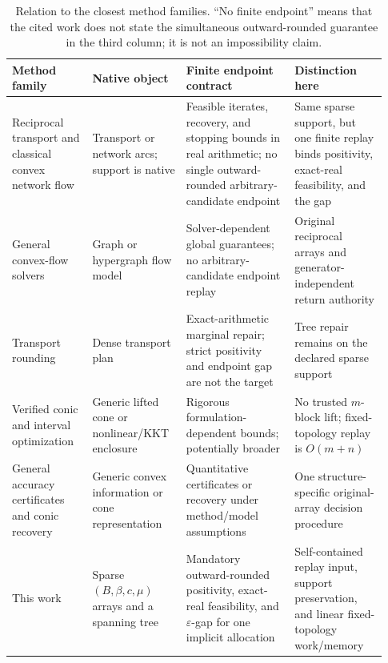\begin{table}[t]
\centering
\caption{Relation to the closest method families.  ``No finite endpoint'' means
that the cited work does not state the simultaneous outward-rounded guarantee
in the third column; it is not an impossibility claim.}
\label{tab:novelty-map}
\scriptsize
\setlength{\tabcolsep}{3pt}
\renewcommand{\arraystretch}{1.12}
\begin{tabular}{@{}
>{\raggedright\arraybackslash}p{0.20\linewidth}
>{\raggedright\arraybackslash}p{0.23\linewidth}
>{\raggedright\arraybackslash}p{0.27\linewidth}
>{\raggedright\arraybackslash}p{0.23\linewidth}@{}}
\toprule
Method family & Native object & Finite endpoint contract & Distinction here \\
\midrule
Reciprocal transport and classical convex network flow
\citep{dessein2018rot,weintraub1974primal,klincewicz1983,
klincewicz1989,bertsekas1997epsilon,marklund2008early}
& Transport or network arcs; support is native
& Feasible iterates, recovery, and stopping bounds in real arithmetic; no
single outward-rounded arbitrary-candidate endpoint
& Same sparse support, but one finite replay binds positivity, exact-real
feasibility, and the gap \\

General convex-flow solvers
\citep{chen2025maxflow,diamandis2024convexflows}
& Graph or hypergraph flow model
& Solver-dependent global guarantees; no arbitrary-candidate endpoint replay
& Original reciprocal arrays and generator-independent return authority \\

Transport rounding \citep{altschuler2017nearlinear}
& Dense transport plan
& Exact-arithmetic marginal repair; strict positivity and endpoint gap are not
the target
& Tree repair remains on the declared sparse support \\

Verified conic and interval optimization
\citep{jansson2004convex,jansson2007conic,jansson2007rigorous,
jansson2009verified,lange2020verification,vsdp2020,rump2010verification}
& Generic lifted cone or nonlinear/KKT enclosure
& Rigorous formulation-dependent bounds; potentially broader
& No trusted $m$-block lift; fixed-topology replay is $O(m+n)$ \\

General accuracy certificates and conic recovery
\citep{nemirovski2010accuracy,burns2026accuracy,
parshakova2025multiple,papp2025fullnewton,lee2025dual}
& Generic convex information or cone representation
& Quantitative certificates or recovery under method/model assumptions
& One structure-specific original-array decision procedure \\

This work
& Sparse $(B,\beta,c,\mu)$ arrays and a spanning tree
& Mandatory outward-rounded positivity, exact-real feasibility, and
$\varepsilon$-gap for one implicit allocation
& Self-contained replay input, support preservation, and linear fixed-topology
work/memory \\
\bottomrule
\end{tabular}
\end{table}
